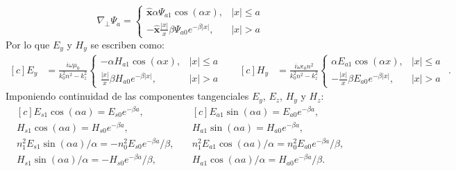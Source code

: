 \begin{equation*}
	\nabla_\perp \Psi_a = \left\{\begin{matrix}
	\hat{\textbf{x}}\alpha\Psi_{a1}\cos(\alpha x), & |x|\le a
	\\
	-\hat{\textbf{x}}\frac{|x|}{x}\beta\Psi_{a0}e^{-\beta|x|}, & |x|>a
	\end{matrix}\right.
\end{equation*}
Por lo que $E_y$ y $H_y$ se escriben como:
\begin{equation*}
	\begin{aligned}[c]
	 E_y &= \frac{i\omega\mu_0}{k_0^2n^2-k_z^2} \left\{\begin{matrix}
	 -\alpha H_{a1}\cos(\alpha x)	, & |x|\le a
	 \\
	 \frac{|x|}{x}\beta H_{a0}e^{-\beta|x|}, & |x|>a
	 \end{matrix}\right.
\end{aligned} 
\quad
	\begin{aligned}[c]
	 H_y &= \frac{i\omega \epsilon_0 n^2}{k_0^2n^2-k_z^2} \left\{\begin{matrix}
	  \alpha E_{a1}\cos(\alpha x),	 & |x|\le a
	 \\
	 -\frac{|x|}{x}\beta E_{a0}e^{-\beta|x|}, & |x|>a
	 \end{matrix}\right.
\end{aligned} .
\end{equation*}
Imponiendo continuidad de las componentes tangenciales $E_y$, $E_z$, $H_y$ y $H_z$:
\begin{equation*}
	\begin{aligned}[c]
	 E_{s1}\cos(\alpha a) = E_{s0}e^{-\beta a},
	 \\	 
	 H_{s1}\cos(\alpha a) = H_{s0}e^{-\beta a},
	 \\
	 	  n_1 ^2 E_{s1}\sin(\alpha a)/\alpha = -n_0^2 E_{s0}e^{-\beta a}/\beta,
	  \\
	  H_{s1}\sin(\alpha a)/\alpha = - H_{s0}e^{-\beta a}/\beta,
\end{aligned} 
\quad
	\begin{aligned}[c]
		 E_{a1}\sin(\alpha a) = E_{a0}e^{-\beta a},
	 	   \\
	 H_{a1}\sin(\alpha a) = H_{a0}e^{-\beta a},
	 \\
	  n_1 ^2 E_{a1}\cos(\alpha a)/\alpha = n_0^2 E_{a0}e^{-\beta a}/\beta,
	 	 \\
	  H_{a1}\cos(\alpha a)/\alpha = H_{a0}e^{-\beta a}/\beta.
\end{aligned} 
\end{equation*}
